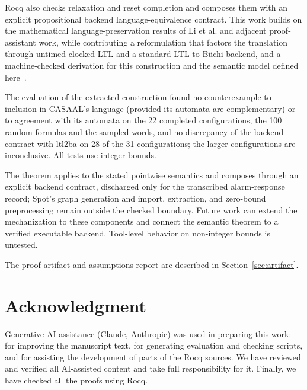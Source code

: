 \documentclass{ieeeaccess}
\begin{document}
Rocq also checks relaxation and reset completion and composes them with an
explicit propositional backend language-equivalence contract. This work builds on the mathematical language-preservation
results of Li et al. and adjacent proof-assistant work, while contributing a
reformulation that factors the
translation through untimed clocked LTL and a standard LTL-to-B\"uchi backend,
and a machine-checked derivation for this
construction and the semantic model defined here~\cite{li_spin7,xu08,roohi_viswanathan_vmcai18}.

The evaluation of the extracted construction found no counterexample to inclusion
in CASAAL's language (provided its automata are complementary) or to agreement
with its automata on the 22 completed configurations, the 100 random formulas
and the sampled words, and no discrepancy of the backend contract with ltl2ba
on 28 of the 31 configurations; the larger configurations are inconclusive.
All tests use integer bounds.

The theorem applies to the stated pointwise semantics and composes
through an explicit backend contract, discharged only for the transcribed
alarm-response record; Spot's graph generation and import, extraction, and
zero-bound preprocessing remain outside the checked boundary. Future work
can extend the mechanization to these components and connect the semantic
theorem to a verified executable backend. Tool-level behavior on non-integer
bounds is untested.

The proof artifact and assumptions report are described in
Section~\ref{sec:artifact}.

\section*{Acknowledgment}
Generative AI assistance (Claude, Anthropic) was used in preparing this work: for improving the
manuscript text, for generating evaluation and checking scripts, and for assisting the development
of parts of the Rocq sources. We have reviewed and verified all AI-assisted content and take full
responsibility for it. Finally, we have checked all the proofs using Rocq.
\end{document}
